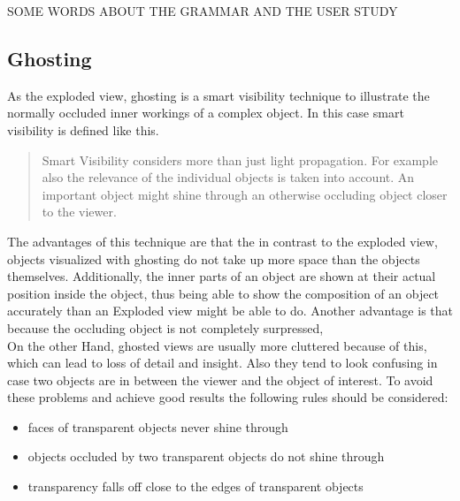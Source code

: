 SOME WORDS ABOUT THE GRAMMAR AND THE USER STUDY

\subsection{Ghosting}
As the exploded view, ghosting is a smart visibility technique to illustrate the normally occluded inner workings of a complex object. In this case smart visibility is defined like this.
\begin{quote}Smart Visibility considers more than just light propagation. For example also the relevance of the individual objects is taken into account. An important object might shine through an otherwise occluding object closer to the viewer. \cite{Viola:2005:SVV:2381219.2381249}\end{quote}
The advantages of this technique are that the in contrast to the exploded view, objects visualized with ghosting do not take up more space than the objects themselves. Additionally, the inner parts of an object are shown at their actual position inside the object, thus being able to show the composition of an object accurately than an Exploded view might be able to do. Another advantage is that because the occluding object is not completely surpressed, \\
On the other Hand, ghosted views are usually more cluttered because of this, which can lead to loss of detail and insight. Also they tend to look confusing in case two objects are in between the viewer and the object of interest. To avoid these problems and achieve good results the following rules should be considered:\cite{Viola:2005:SVV:2381219.2381249}
\begin{itemize}
\item faces of transparent objects never shine through
\item objects occluded by two transparent objects do not shine through
\item transparency falls off close to the edges of transparent objects
\end{itemize}
